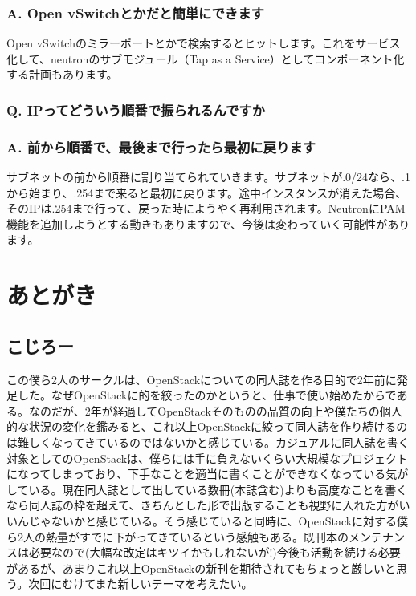 \documentclass[9pt,b5paper,tombo,openany]{jsbook}
\begin{document}
\subsection*{{\LARGE\bfseries A.} Open vSwitchとかだと簡単にできます}
Open vSwitchのミラーポートとかで検索するとヒットします。これをサービス化して、neutronのサブモジュール（Tap as a Service）としてコンポーネント化する計画もあります。

\subsection*{{\LARGE\bfseries Q.} IPってどういう順番で振られるんですか}
\subsection*{{\LARGE\bfseries A.} 前から順番で、最後まで行ったら最初に戻ります}
サブネットの前から順番に割り当てられていきます。サブネットが.0/24なら、.1から始まり、.254まで来ると最初に戻ります。途中インスタンスが消えた場合、そのIPは.254まで行って、戻った時にようやく再利用されます。NeutronにPAM機能を追加しようとする動きもありますので、今後は変わっていく可能性があります。

\chapter{あとがき}

\section*{こじろー}

この僕ら2人のサークルは、OpenStackについての同人誌を作る目的で2年前に発足した。なぜOpenStackに的を絞ったのかというと、仕事で使い始めたからである。なのだが、2年が経過してOpenStackそのものの品質の向上や僕たちの個人的な状況の変化を鑑みると、これ以上OpenStackに絞って同人誌を作り続けるのは難しくなってきているのではないかと感じている。カジュアルに同人誌を書く対象としてのOpenStackは、僕らには手に負えないくらい大規模なプロジェクトになってしまっており、下手なことを適当に書くことができなくなっている気がしている。現在同人誌として出している数冊(本誌含む)よりも高度なことを書くなら同人誌の枠を超えて、きちんとした形で出版することも視野に入れた方がいいんじゃないかと感じている。そう感じていると同時に、OpenStackに対する僕ら2人の熱量がすでに下がってきているという感触もある。既刊本のメンテナンスは必要なので(大幅な改定はキツイかもしれないが!)今後も活動を続ける必要があるが、あまりこれ以上OpenStackの新刊を期待されてもちょっと厳しいと思う。次回にむけてまた新しいテーマを考えたい。
\end{document}

